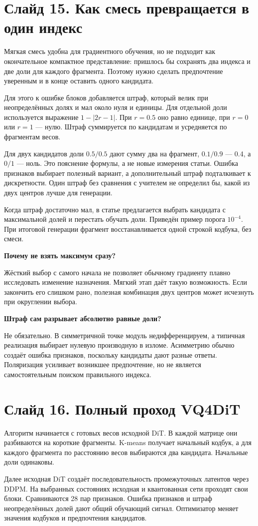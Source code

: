 \documentclass[a4paper,11pt]{article}
\newcommand{\slide}[2]{\clearpage\section*{Слайд #1. #2}}
\newcommand{\question}[1]{\par\textbf{#1}\par}
\begin{document}
\slide{15}{Как смесь превращается в один индекс}
Мягкая смесь удобна для градиентного обучения, но не подходит как
окончательное компактное представление: пришлось бы сохранять два
индекса и две доли для каждого фрагмента. Поэтому нужно сделать
предпочтение уверенным и в конце оставить одного кандидата.

Для этого к ошибке блоков добавляется штраф, который велик
при неопределённых долях и мал около нуля и единицы.
Для отдельной доли используется выражение $1-|2r-1|$.
При $r=0.5$ оно равно единице, при $r=0$ или $r=1$ --- нулю.
Штраф суммируется по кандидатам и усредняется по фрагментам весов.

Для двух кандидатов доли $0.5/0.5$ дают сумму два на фрагмент,
$0.1/0.9$ --- 0.4, а $0/1$ --- ноль. Это пояснение формулы,
а не новые измерения статьи. Ошибка признаков выбирает полезный
вариант, а дополнительный штраф подталкивает к дискретности.
Один штраф без сравнения с учителем не определил бы,
какой из двух центров лучше для генерации.

Когда штраф достаточно мал, в статье предлагается выбрать
кандидата с максимальной долей и перестать обучать доли.
Приведён пример порога $10^{-4}$. При итоговой генерации
фрагмент восстанавливается одной строкой кодбука, без смеси.

\question{Почему не взять максимум сразу?}
Жёсткий выбор с самого начала не позволяет обычному градиенту
плавно исследовать изменение назначения. Мягкий этап даёт
такую возможность. Если закончить его слишком рано, полезная
комбинация двух центров может исчезнуть при округлении выбора.

\question{Штраф сам разрывает абсолютно равные доли?}
Не обязательно. В симметричной точке модуль недифференцируем,
а типичная реализация выбирает нулевую производную в изломе.
Асимметрию обычно создаёт ошибка признаков, поскольку кандидаты
дают разные ответы. Поляризация усиливает возникшее предпочтение,
но не является самостоятельным поиском правильного индекса.

\slide{16}{Полный проход VQ4DiT}
Алгоритм начинается с готовых весов исходной DiT.
В каждой матрице они разбиваются на короткие фрагменты.
K-means получает начальный кодбук, а для каждого фрагмента
по расстоянию весов выбираются два кандидата.
Начальные доли одинаковы.

Далее исходная DiT создаёт последовательность промежуточных
латентов через DDPM. На выбранных состояниях исходная
и квантованная сети проходят свои блоки. Сравниваются
28 пар признаков. Ошибка признаков и штраф неопределённых
долей дают общий обучающий сигнал. Оптимизатор меняет
значения кодбуков и предпочтения кандидатов.
\end{document}
